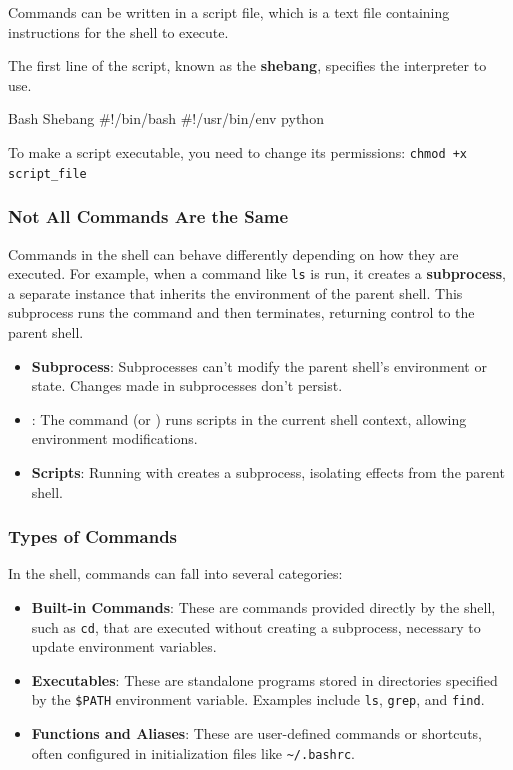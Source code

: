 Commands can be written in a script file, which is a text file containing instructions for the shell to execute. 

The first line of the script, known as the \textbf{shebang}, specifies the interpreter to use.

\begin{neonlisting}[language=bash]{Bash Shebang}
#!/bin/bash
#!/usr/bin/env python
\end{neonlisting}

To make a script executable, you need to change its permissions:
\texttt{chmod +x script\_file}

\subsubsection{Not All Commands Are the Same}

Commands in the shell can behave differently depending on how they are executed. For example, when a command like \texttt{ls} is run, it creates a \textbf{subprocess}, a separate instance that inherits the environment of the parent shell. This subprocess runs the command and then terminates, returning control to the parent shell.

\begin{tipsblock}
    \begin{itemize}
        \item \textbf{Subprocess}: Subprocesses can't modify the parent shell's environment or state. Changes made in subprocesses don't persist.
        \item \textbf{}: The  command (or ) runs scripts in the current shell context, allowing environment modifications.
        \item \textbf{Scripts}: Running with  creates a subprocess, isolating effects from the parent shell.
    \end{itemize}
\end{tipsblock}

\subsubsection{Types of Commands}

In the shell, commands can fall into several categories:

\begin{itemize}
    \item \textbf{Built-in Commands}: These are commands provided directly by the shell, such as \texttt{cd}, that are executed without creating a subprocess, necessary to update environment variables.
    \item \textbf{Executables}: These are standalone programs stored in directories specified by the \texttt{\$PATH} environment variable. Examples include \texttt{ls}, \texttt{grep}, and \texttt{find}.
    \item \textbf{Functions and Aliases}: These are user-defined commands or shortcuts, often configured in initialization files like \texttt{\textasciitilde/.bashrc}.
\end{itemize}

